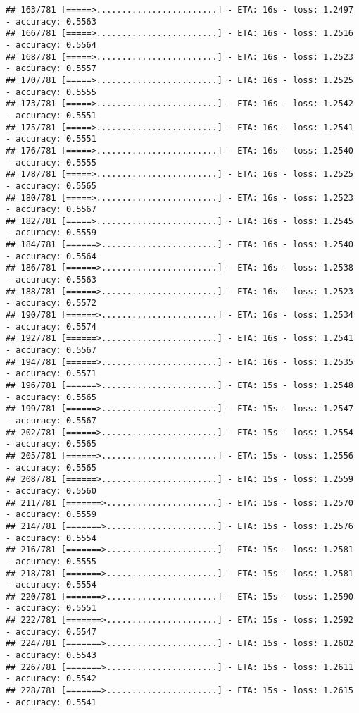 \documentclass[
]{article}
\begin{document}
\begin{verbatim}
## 163/781 [=====>........................] - ETA: 16s - loss: 1.2497 - accuracy: 0.5563
## 166/781 [=====>........................] - ETA: 16s - loss: 1.2516 - accuracy: 0.5564
## 168/781 [=====>........................] - ETA: 16s - loss: 1.2523 - accuracy: 0.5557
## 170/781 [=====>........................] - ETA: 16s - loss: 1.2525 - accuracy: 0.5555
## 173/781 [=====>........................] - ETA: 16s - loss: 1.2542 - accuracy: 0.5551
## 175/781 [=====>........................] - ETA: 16s - loss: 1.2541 - accuracy: 0.5551
## 176/781 [=====>........................] - ETA: 16s - loss: 1.2540 - accuracy: 0.5555
## 178/781 [=====>........................] - ETA: 16s - loss: 1.2525 - accuracy: 0.5565
## 180/781 [=====>........................] - ETA: 16s - loss: 1.2523 - accuracy: 0.5567
## 182/781 [=====>........................] - ETA: 16s - loss: 1.2545 - accuracy: 0.5559
## 184/781 [======>.......................] - ETA: 16s - loss: 1.2540 - accuracy: 0.5564
## 186/781 [======>.......................] - ETA: 16s - loss: 1.2538 - accuracy: 0.5563
## 188/781 [======>.......................] - ETA: 16s - loss: 1.2523 - accuracy: 0.5572
## 190/781 [======>.......................] - ETA: 16s - loss: 1.2534 - accuracy: 0.5574
## 192/781 [======>.......................] - ETA: 16s - loss: 1.2541 - accuracy: 0.5567
## 194/781 [======>.......................] - ETA: 16s - loss: 1.2535 - accuracy: 0.5571
## 196/781 [======>.......................] - ETA: 15s - loss: 1.2548 - accuracy: 0.5565
## 199/781 [======>.......................] - ETA: 15s - loss: 1.2547 - accuracy: 0.5567
## 202/781 [======>.......................] - ETA: 15s - loss: 1.2554 - accuracy: 0.5565
## 205/781 [======>.......................] - ETA: 15s - loss: 1.2556 - accuracy: 0.5565
## 208/781 [======>.......................] - ETA: 15s - loss: 1.2559 - accuracy: 0.5560
## 211/781 [=======>......................] - ETA: 15s - loss: 1.2570 - accuracy: 0.5559
## 214/781 [=======>......................] - ETA: 15s - loss: 1.2576 - accuracy: 0.5554
## 216/781 [=======>......................] - ETA: 15s - loss: 1.2581 - accuracy: 0.5555
## 218/781 [=======>......................] - ETA: 15s - loss: 1.2581 - accuracy: 0.5554
## 220/781 [=======>......................] - ETA: 15s - loss: 1.2590 - accuracy: 0.5551
## 222/781 [=======>......................] - ETA: 15s - loss: 1.2592 - accuracy: 0.5547
## 224/781 [=======>......................] - ETA: 15s - loss: 1.2602 - accuracy: 0.5543
## 226/781 [=======>......................] - ETA: 15s - loss: 1.2611 - accuracy: 0.5542
## 228/781 [=======>......................] - ETA: 15s - loss: 1.2615 - accuracy: 0.5541

\end{verbatim}
\end{document}
